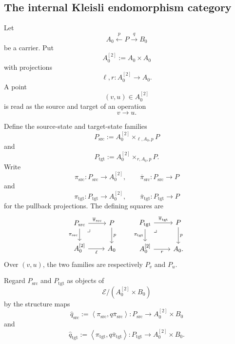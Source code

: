 \subsection{The internal Kleisli endomorphism category}
\label{subsec:to-internal-klend}

Let
\[
    A_0\xleftarrow{p}P\xrightarrow{q}B_0
\]
be a carrier. Put
\[
    A_0^{[2]}:=A_0\times A_0
\]
with projections
\[
    \ell,r:A_0^{[2]}\to A_0.
\]
A point
\[
    (v,u)\in A_0^{[2]}
\]
is read as the source and target of an operation
\[
    v\to u.
\]

Define the source-state and target-state families
\[
    P_{\mathrm{src}}
    :=
    A_0^{[2]}
    \times_{\ell,A_0,p}
    P
\]
and
\[
    P_{\mathrm{tgt}}
    :=
    A_0^{[2]}
    \times_{r,A_0,p}
    P.
\]
Write
\[
    \pi_{\mathrm{src}}:
    P_{\mathrm{src}}\to A_0^{[2]},
    \qquad
    \overline\pi_{\mathrm{src}}:
    P_{\mathrm{src}}\to P
\]
and
\[
    \pi_{\mathrm{tgt}}:
    P_{\mathrm{tgt}}\to A_0^{[2]},
    \qquad
    \overline\pi_{\mathrm{tgt}}:
    P_{\mathrm{tgt}}\to P
\]
for the pullback projections. The defining squares are
\[
\begin{tikzcd}
    P_{\mathrm{src}}
        \arrow[r, "\overline\pi_{\mathrm{src}}"]
        \arrow[d, "\pi_{\mathrm{src}}"']
        \arrow[dr, phantom, "\lrcorner", very near start]
    &
    P
        \arrow[d, "p"]
    \\
    A_0^{[2]}
        \arrow[r, "\ell"']
    &
    A_0
\end{tikzcd}
\qquad
\begin{tikzcd}
    P_{\mathrm{tgt}}
        \arrow[r, "\overline\pi_{\mathrm{tgt}}"]
        \arrow[d, "\pi_{\mathrm{tgt}}"']
        \arrow[dr, phantom, "\lrcorner", very near start]
    &
    P
        \arrow[d, "p"]
    \\
    A_0^{[2]}
        \arrow[r, "r"']
    &
    A_0.
\end{tikzcd}
\]
Over \((v,u)\), the two families are respectively \(P_v\) and \(P_u\).

Regard \(P_{\mathrm{src}}\) and \(P_{\mathrm{tgt}}\) as objects of
\[
    \mathcal E/(A_0^{[2]}\times B_0)
\]
by the structure maps
\[
    \widehat q_{\mathrm{src}}
    :=
    \left\langle
        \pi_{\mathrm{src}},
        q\overline\pi_{\mathrm{src}}
    \right\rangle:
    P_{\mathrm{src}}
    \to
    A_0^{[2]}\times B_0
\]
and
\[
    \widehat q_{\mathrm{tgt}}
    :=
    \left\langle
        \pi_{\mathrm{tgt}},
        q\overline\pi_{\mathrm{tgt}}
    \right\rangle:
    P_{\mathrm{tgt}}
    \to
    A_0^{[2]}\times B_0.
\]

